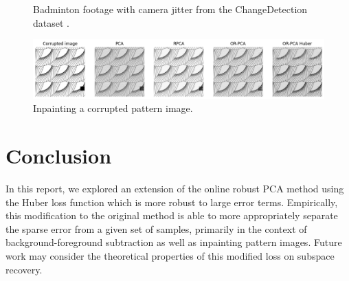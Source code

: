 \documentclass[a4paper,11pt]{article}
\begin{document}
\begin{figure}[ht]
  \begin{center}
  \end{center}
  \caption{Badminton footage with camera jitter from the ChangeDetection dataset
  \label{fig:badminton}
  \cite{changedetection}.}
\end{figure}

\begin{figure}[!htbp]
  \begin{center}
    \includegraphics[width=\linewidth]{corupted_pattern.png}
  \end{center}
  \caption{Inpainting a corrupted pattern image.}
  \label{fig:pattern}
\end{figure}

\clearpage
\section{Conclusion}
In this report, we explored an extension of the online robust PCA method using
the Huber loss function which is more robust to large error terms. Empirically,
this modification to the original method is able to more appropriately separate the 
sparse error from a given set of samples, primarily in the context of
background-foreground subtraction as well as inpainting pattern images. Future
work may consider the theoretical properties of this modified loss on subspace
recovery.

\printbibliography
\end{document}
